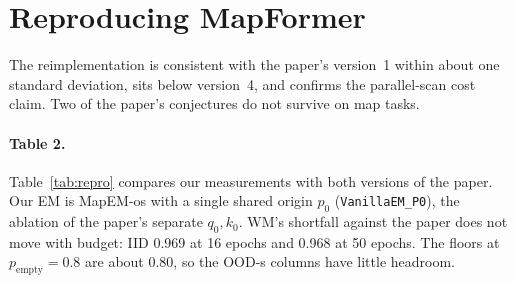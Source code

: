 \documentclass[10pt]{article}
\newcommand{\arm}[1]{\texttt{#1}}
\begin{document}
\section{Reproducing MapFormer}
\label{sec:repro}

The reimplementation is consistent with the paper's version~1 within about one standard deviation,
sits below version~4, and confirms the parallel-scan cost claim. Two of the paper's conjectures do
not survive on map tasks.

\paragraph{Table 2.} Table~\ref{tab:repro} compares our measurements with both versions of the
paper. Our EM is MapEM-os with a single shared origin $p_0$ (\arm{VanillaEM\_P0}), the ablation of the paper's
separate $q_0,k_0$. WM's shortfall against the paper does not move with budget:
IID 0.969 at 16 epochs and 0.968 at 50 epochs. The floors at $p_{\mathrm{empty}}=0.8$ are about
0.80, so the OOD-s columns have little headroom.
\end{document}
